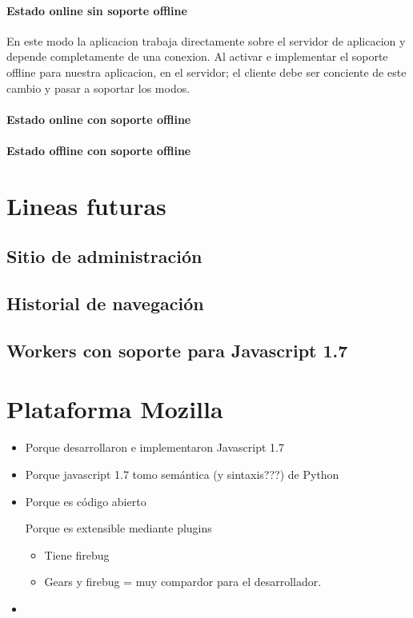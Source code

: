 \documentclass[a4paper]{report}
\begin{document}
\subsubsection{Estado online sin soporte offline}
En este modo la aplicacion trabaja directamente sobre el servidor de aplicacion y depende completamente de una conexion.
Al activar e implementar el soporte offline para nuestra aplicacion, en el servidor; el cliente debe ser conciente de este cambio y pasar a soportar los modos.
\subsubsection{Estado online con soporte offline}
\subsubsection{Estado offline con soporte offline}

\chapter{Lineas futuras}
\section{Sitio de administración}
\section{Historial de navegación}
\section{Workers con soporte para Javascript 1.7}

\appendix




\chapter{Plataforma Mozilla}
\begin{itemize}
  \item Porque desarrollaron e implementaron Javascript 1.7
  \item Porque javascript 1.7 tomo semántica (y sintaxis???) de Python
  \item Porque es código abierto
  \begin{item}
  	Porque es extensible mediante plugins
  	\begin{itemize}
        \item Tiene firebug
        \item Gears y firebug = muy compardor para el desarrollador.
     \end{itemize}
      
  \end{item}
  \item 
\end{itemize}
\end{document}
